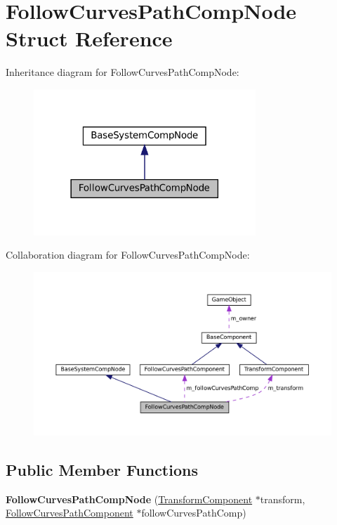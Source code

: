 \hypertarget{structFollowCurvesPathCompNode}{}\section{Follow\+Curves\+Path\+Comp\+Node Struct Reference}
\label{structFollowCurvesPathCompNode}


Inheritance diagram for Follow\+Curves\+Path\+Comp\+Node\+:
\nopagebreak
\begin{figure}[H]
\begin{center}
\leavevmode
\includegraphics[width=237pt]{structFollowCurvesPathCompNode__inherit__graph}
\end{center}
\end{figure}


Collaboration diagram for Follow\+Curves\+Path\+Comp\+Node\+:
\nopagebreak
\begin{figure}[H]
\begin{center}
\leavevmode
\includegraphics[width=350pt]{structFollowCurvesPathCompNode__coll__graph}
\end{center}
\end{figure}
\subsection*{Public Member Functions}
\begin{DoxyCompactItemize}
\item 
\mbox{\label{structFollowCurvesPathCompNode_ad7a9cac3f398bf3e0a318a313f02c6f1}} 
{\bfseries Follow\+Curves\+Path\+Comp\+Node} (\hyperlink{classTransformComponent}{Transform\+Component} $\ast$transform, \hyperlink{classFollowCurvesPathComponent}{Follow\+Curves\+Path\+Component} $\ast$follow\+Curves\+Path\+Comp)
\end{DoxyCompactItemize}
